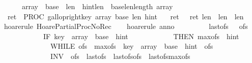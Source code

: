 \begin{isabellebody}
\ \ {\isachardoublequoteopen}{\isasymforall}{\isasymsigma}{\isachardot}\ {\isasymGamma}{\isasymturnstile}\ {\isasymlbrace}\ {\isasymsigma}{\isachardot}\ {\isasymacute}array{\isasymnoteq}{\isacharbrackleft}{\isacharbrackright}\ {\isasymand}\ {\isasymacute}base{\isasymge}{}\ {\isasymand}\ {\isasymacute}len{\isachargreater}{}\ {\isasymand}\ {\isasymacute}hint{\isacharless}{\isasymacute}len\ {\isasymand}\ {\isasymacute}base{\isacharplus}{\isasymacute}len{\isasymle}length\ {\isasymacute}array{\isasymrbrace}\isanewline
\ \ {\isasymacute}ret\ {\isacharcolon}{\isacharequal}{\isacharequal}\ PROC\ gallop{\isacharunderscore}right{\isacharparenleft}{\isasymacute}key{\isacharcomma}\ {\isasymacute}array{\isacharcomma}\ {\isasymacute}base{\isacharcomma}\ {\isasymacute}len{\isacharcomma}\ {\isasymacute}hint{\isacharparenright}\isanewline
\ \ {\isasymlbrace}\ {\isasymacute}ret\ {\isasymge}{}\ {\isasymand}\ {\isasymacute}ret\ {\isasymle}{\isasymacute}len\ {\isasymand}\ {\isasymacute}len\ {\isacharequal}\ \isactrlbsup {\isasymsigma}\isactrlesup len{\isasymrbrace}{\isachardoublequoteclose}\isanewline
%
\isadelimproof
\ \ %
\endisadelimproof
%
\isatagproof
{}\isamarkupfalse%
\ {\isacharparenleft}hoare{\isacharunderscore}rule\ HoarePartial{\isachardot}ProcNoRec{}{\isacharparenright}\isanewline
\ \ \isamarkupfalse%
\ {\isacharparenleft}hoare{\isacharunderscore}rule\ anno{\isacharequal}{\isachardoublequoteopen}\isanewline
\ \ \ \ \ \ \ \ \ {\isasymacute}last{\isacharunderscore}ofs\ {\isacharcolon}{\isacharequal}{\isacharequal}\ {}{\isacharsemicolon}{\isacharsemicolon}\ {\isasymacute}ofs\ {\isacharcolon}{\isacharequal}{\isacharequal}\ {}{\isacharsemicolon}{\isacharsemicolon}\isanewline
\ \ \ \ \ \ \ \ \ \ \ \ IF\ {\isasymacute}key\ {\isacharless}\ {\isasymacute}array\ {\isacharbang}\ {\isacharparenleft}{\isasymacute}base\ {\isacharplus}\ {\isasymacute}hint{\isacharparenright}\isanewline
\ \ \ \ \ \ \ \ \ \ \ \ THEN\ {\isasymacute}max{\isacharunderscore}ofs\ {\isacharcolon}{\isacharequal}{\isacharequal}\ {\isasymacute}hint\ {\isacharplus}\ {}{\isacharsemicolon}{\isacharsemicolon}\isanewline
\ \ \ \ \ \ \ \ \ \ \ \ \ \ WHILE\ {\isasymacute}ofs\ {\isacharless}\ {\isasymacute}max{\isacharunderscore}ofs\ {\isasymand}\ {\isasymacute}key\ {\isacharless}\ {\isasymacute}array\ {\isacharbang}\ {\isacharparenleft}{\isasymacute}base\ {\isacharplus}\ {\isasymacute}hint\ {\isacharminus}\ {\isasymacute}ofs{\isacharparenright}\isanewline
\ \ \ \ \ \ \ \ \ \ \ \ \ \ INV\ {\isasymlbrace}\ {\isasymacute}ofs{\isachargreater}{}\ {\isasymand}\ {\isasymacute}last{\isacharunderscore}ofs{\isasymge}{}\ {\isasymand}\ {\isasymacute}last{\isacharunderscore}ofs{\isacharless}{\isasymacute}ofs\ {\isasymand}\ {\isasymacute}last{\isacharunderscore}ofs{\isacharless}{\isasymacute}max{\isacharunderscore}ofs\ {\isasymand}\isanewline

\end{isabellebody}
